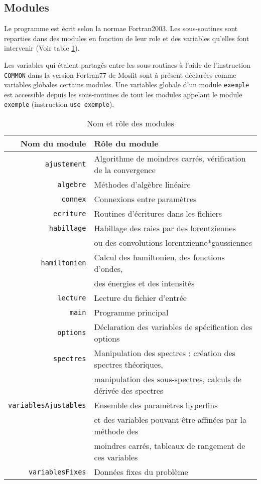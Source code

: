 \FloatBarrier
\subsection{Modules}
Le programme est écrit selon la normae Fortran2003. 
Les sous-soutines sont reparties dans des modules en fonction de leur role
et des variables qu'elles font intervenir (Voir table \ref{tab:role_module}).

Les variables qui étaient partagés entre les sous-routines à l'aide de l'instruction \lstinline{COMMON} dans la version Fortran77 de Mosfit
sont à présent déclarées comme variables globales certains modules.
Une variables globale d'un module \lstinline{exemple} est accessible depuis les sous-routines de tout les modules appelant le module \lstinline{exemple} (instruction \lstinline{use exemple}).

\begin{table}
\begin{tabular}{|r|l|}
\hline
Nom du module & R\^ole du module\\ \hline \hline
 \lstinline{ajustement} & Algorithme de moindres carrés, vérification de la convergence \\\hline
 \lstinline{algebre} & Méthodes d'algèbre linéaire\\\hline
 \lstinline{connex}	& Connexions entre paramètres \\\hline
 \lstinline{ecriture} &Routines d'écritures dans les fichiers\\\hline
 \lstinline{habillage} &Habillage des raies par des lorentziennes\\
          & ou des convolutions lorentzienne*gaussiennes\\\hline
  \lstinline{hamiltonien} & Calcul des hamiltonien, des fonctions d'ondes,\\
          & des énergies et des intensités \\\hline
 \lstinline{lecture} &Lecture du fichier d'entrée\\\hline
 \lstinline{main} & Programme principal \\ \hline
 \lstinline{options} & Déclaration des variables de spécification des options\\\hline
 \lstinline{spectres}	& Manipulation des spectres : création des spectres théoriques, \\
        &  manipulation des sous-spectres, calculs de dérivée des spectres\\\hline
 \lstinline{variablesAjustables} & Ensemble des paramètres hyperfins \\
      & et des variables pouvant être affinées par la méthode des \\
      &moindres carrés, tableaux de rangement de ces variables\\\hline
 \lstinline{variablesFixes}	& Données fixes du problème \\ \hline
\end{tabular}
\caption{\label{tab:role_module}Nom et rôle des modules}
\end{table}

